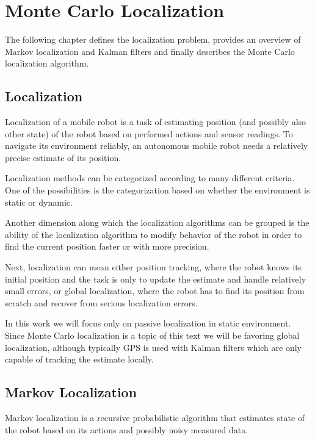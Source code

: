 \chapter{Monte Carlo Localization}
\label{chap:mcl}

The following chapter defines the localization problem, provides an overview
of Markov localization and Kalman filters and finally describes
the Monte Carlo localization algorithm.

\section{Localization}
Localization of a mobile robot is a task of estimating position (and possibly
also other state) of the robot based on performed actions and sensor readings.
To navigate its environment reliably, an autonomous mobile robot needs
a relatively precise estimate of its position.

Localization methods can be categorized according to many different criteria.
One of the possibilities is the categorization based on whether the environment is static
or dynamic.

Another dimension along which the localization algorithms can be grouped
is the ability of the localization algorithm to modify behavior of the robot
in order to find the current position faster or with more precision.

Next, localization can mean either position tracking, where the robot knows its initial
position and the task is only to update the estimate and handle relatively small
errors, or global localization, where the robot has to find its position from scratch
and recover from serious localization errors.

In this work we will focus only on passive localization in static environment.
Since Monte Carlo localization is a topic of this text we will be favoring
global localization, although typically GPS is used with Kalman filters
which are only capable of tracking the estimate locally.

\section{Markov Localization}

Markov localization \cite{fox98,diard03} is a recursive probabilistic
algorithm that estimates state of the robot based on its
actions and possibly noisy measured data.


